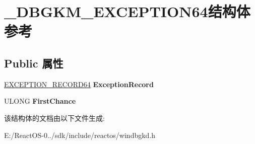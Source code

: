 \hypertarget{struct___d_b_g_k_m___e_x_c_e_p_t_i_o_n64}{}\section{\+\_\+\+D\+B\+G\+K\+M\+\_\+\+E\+X\+C\+E\+P\+T\+I\+O\+N64结构体 参考}
\label{struct___d_b_g_k_m___e_x_c_e_p_t_i_o_n64}
\subsection*{Public 属性}
\begin{DoxyCompactItemize}
\item 
\mbox{\label{struct___d_b_g_k_m___e_x_c_e_p_t_i_o_n64_af858d1c4dac16f790cfc2461e10bedef}} 
\hyperlink{struct___e_x_c_e_p_t_i_o_n___r_e_c_o_r_d64}{E\+X\+C\+E\+P\+T\+I\+O\+N\+\_\+\+R\+E\+C\+O\+R\+D64} {\bfseries Exception\+Record}
\item 
\mbox{\label{struct___d_b_g_k_m___e_x_c_e_p_t_i_o_n64_a5d909bc7a50ae17617d2185e65aea158}} 
U\+L\+O\+NG {\bfseries First\+Chance}
\end{DoxyCompactItemize}


该结构体的文档由以下文件生成\+:\begin{DoxyCompactItemize}
\item 
E\+:/\+React\+O\+S-\/0../sdk/include/reactos/windbgkd.\+h\end{DoxyCompactItemize}
